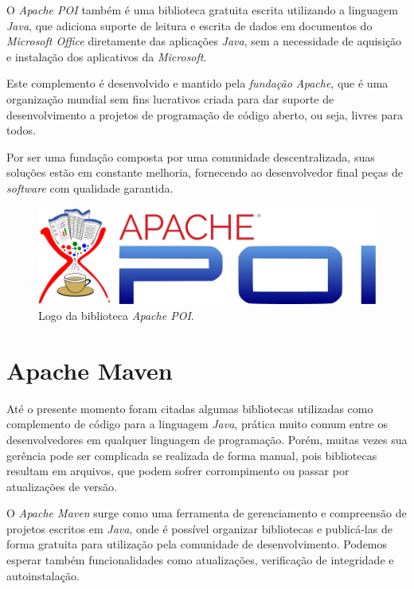 \documentclass[
	12pt,			%
	openright,		%
	oneside,	
	a4paper,		%
	english,		%
	brazil			%
]{abntex2/abntex2}  %
\begin{document}
	O \textit{Apache POI} \cite{poi} também é uma biblioteca gratuita escrita utilizando a linguagem \textit{Java}, que adiciona suporte de leitura e escrita de dados em documentos do \textit{Microsoft Office} diretamente das aplicações \textit{Java}, sem a necessidade de aquisição e instalação dos aplicativos da \textit{Microsoft}.
	
	Este complemento é desenvolvido e mantido pela \textit{fundação Apache}, que é uma organização mundial sem fins lucrativos criada para dar suporte de desenvolvimento a projetos de programação de código aberto, ou seja, livres para todos.
	
	Por ser uma fundação composta por uma comunidade descentralizada, suas soluções estão em constante melhoria, fornecendo ao desenvolvedor final peças de \textit{software} com qualidade garantida.

	\begin{figure}[H]
		\caption{\label{apache-poi}Logo da biblioteca \textit{Apache POI}.}
		\begin{center}
			\includegraphics[scale=0.35]{img/apache-poi}
		\end{center}
	\end{figure}

	\section{Apache Maven}
	
	Até o presente momento foram citadas algumas bibliotecas utilizadas como complemento de código para a linguagem \textit{Java}, prática muito comum entre os desenvolvedores em qualquer linguagem de programação. Porém, muitas vezes sua gerência pode ser complicada se realizada de forma manual, pois bibliotecas resultam em arquivos, que podem sofrer corrompimento ou passar por atualizações de versão.
	
	O \textit{Apache Maven} \cite{maven} surge como uma ferramenta de gerenciamento e compreensão de projetos escritos em \textit{Java}, onde é possível organizar bibliotecas e publicá-las de forma gratuita para utilização pela comunidade de desenvolvimento. Podemos esperar também funcionalidades como atualizações, verificação de integridade e autoinstalação.
	
\end{document}
